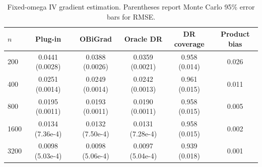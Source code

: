 \begin{table}[t]
\centering
\small
\setlength{\tabcolsep}{5pt}
\caption{Fixed-omega IV gradient estimation. Parentheses report Monte Carlo 95\% error bars for RMSE.}
\label{tab:generated-iv-gradient}
\begin{tabular}{lccccc}
\toprule
$n$ & Plug-in & OBiGrad & Oracle DR & DR coverage & Product bias \\
\midrule
200 & 0.0441 (0.0028) & 0.0388 (0.0026) & 0.0359 (0.0021) & 0.958 (0.014) & 0.026 \\
400 & 0.0251 (0.0014) & 0.0249 (0.0014) & 0.0242 (0.0013) & 0.961 (0.015) & 0.011 \\
800 & 0.0195 (0.0011) & 0.0193 (0.0011) & 0.0190 (0.0011) & 0.958 (0.015) & 0.005 \\
1600 & 0.0134 (7.36e-4) & 0.0132 (7.50e-4) & 0.0131 (7.28e-4) & 0.958 (0.015) & 0.002 \\
3200 & 0.0098 (5.03e-4) & 0.0098 (5.06e-4) & 0.0097 (5.04e-4) & 0.939 (0.018) & 0.001 \\
\bottomrule
\end{tabular}
\end{table}
